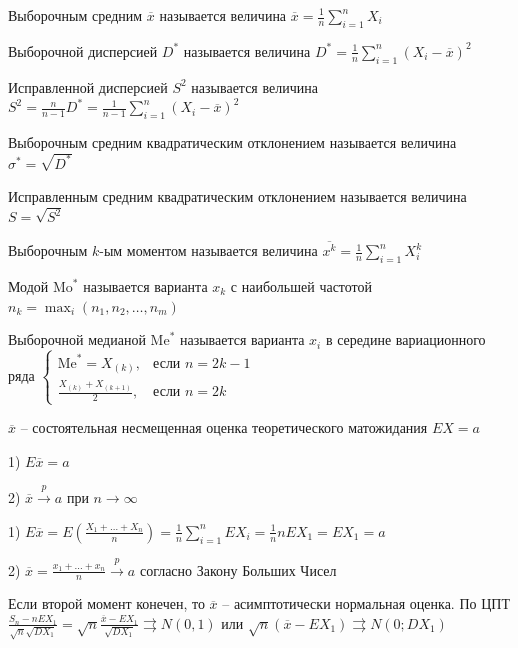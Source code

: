 \Def Выборочным средним $\overline{x}$ называется величина $\overline{x} = \frac{1}{n} \sum_{i = 1}^n X_i$

\Defs Выборочной дисперсией $D^*$ называется величина $D^* = \frac{1}{n} \sum_{i = 1}^n (X_i - \overline{x})^2$

\Defs Исправленной дисперсией $S^2$ называется величина $S^2 = \frac{n}{n - 1} D^* = \frac{1}{n - 1} \sum_{i = 1}^n (X_i - \overline{x})^2$

\Defs Выборочным средним квадратическим отклонением называется величина $\sigma^* = \sqrt{D^*}$

\Defs Исправленным средним квадратическим отклонением называется величина $S = \sqrt{S^2}$

\Defs Выборочным $k$-ым моментом называется величина $\overline{x^k} = \frac{1}{n} \sum_{i = 1}^n X_i^k$

\Defs Модой $\mathrm{Mo}^*$ называется варианта $x_k$ с наибольшей частотой $n_k = \max_i (n_1, n_2, \dots, n_m)$

\Defs Выборочной медианой $\mathrm{Me}^*$ называется варианта $x_i$ в середине вариационного ряда $\begin{cases}\mathrm{Me}^* = 
X_{(k)}, & \text{если } n = 2k - 1 \\ \frac{X_{(k)} + X_{(k + 1)}}{2}, & \text{если } n = 2k\end{cases}$

\begin{MyTheorem}
    \Ths $\overline{x}$ -- состоятельная несмещенная оценка теоретического матожидания $EX = a$

    1) $E \overline{x} = a$

    2) $\overline{x} \overset{p}{\longrightarrow} a$ при $n \to \infty$
\end{MyTheorem}

\begin{MyProof}
    1) $E \overline{x} = E\left(\frac{X_1 + \dots + X_n}{n}\right) = \frac{1}{n} \sum_{i = 1}^n E X_i = 
    \frac{1}{n} n E X_1 = E X_1 = a$

    2) $\overline{x} = \frac{x_1 + \dots + x_n}{n} \overset{p}{\longrightarrow} a$ 
    согласно Закону Больших Чисел
\end{MyProof}

\Nota Если второй момент конечен, то $\overline{x}$ -- асимптотически нормальная оценка. По ЦПТ $\frac{S_n - n E X_1}{\sqrt{n} \sqrt{D X_1}} = \sqrt{n} \frac{\overline{x} - E X_1}{\sqrt{D X_1}} \rightrightarrows N(0, 1)$
или $\sqrt{n} (\overline{x} - E X_1) \rightrightarrows N(0; D X_1)$

